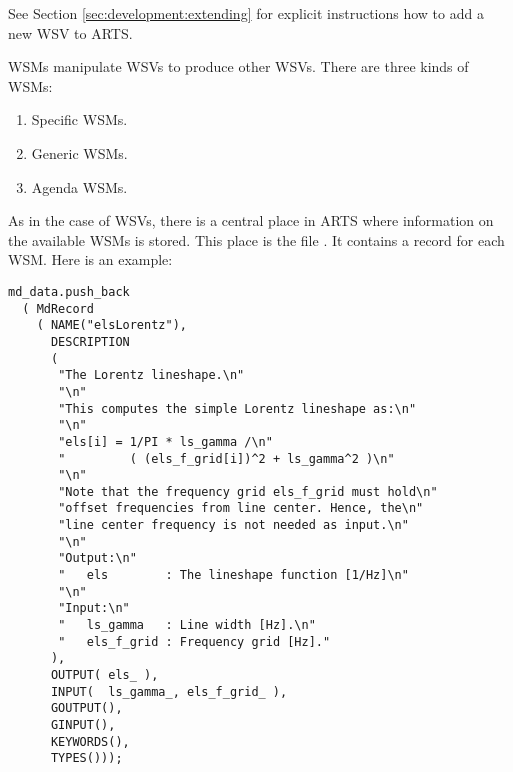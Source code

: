 \noindent
See Section \ref{sec:development:extending} for explicit
instructions how to add a new WSV to ARTS.

\label{sec:agendas:wsms}

WSMs manipulate WSVs to produce other WSVs. There are three kinds of
WSMs:
\begin{enumerate}
\item Specific WSMs.
\item Generic WSMs.
\item Agenda WSMs.
\end{enumerate}
As in the case of WSVs, there is a central place in ARTS where
information on the available WSMs is stored. This place is the file
. It contains a record for each WSM. Here is an
example:

{\small
\begin{verbatim}
md_data.push_back
  ( MdRecord
    ( NAME("elsLorentz"),
      DESCRIPTION
      (
       "The Lorentz lineshape.\n"
       "\n"
       "This computes the simple Lorentz lineshape as:\n"
       "\n"
       "els[i] = 1/PI * ls_gamma /\n"
       "         ( (els_f_grid[i])^2 + ls_gamma^2 )\n"
       "\n"
       "Note that the frequency grid els_f_grid must hold\n"
       "offset frequencies from line center. Hence, the\n"
       "line center frequency is not needed as input.\n"
       "\n"
       "Output:\n"
       "   els        : The lineshape function [1/Hz]\n"
       "\n"
       "Input:\n"
       "   ls_gamma   : Line width [Hz].\n"
       "   els_f_grid : Frequency grid [Hz]."
      ),
      OUTPUT( els_ ),
      INPUT(  ls_gamma_, els_f_grid_ ),
      GOUTPUT(),
      GINPUT(),
      KEYWORDS(),
      TYPES()));
\end{verbatim}
}

